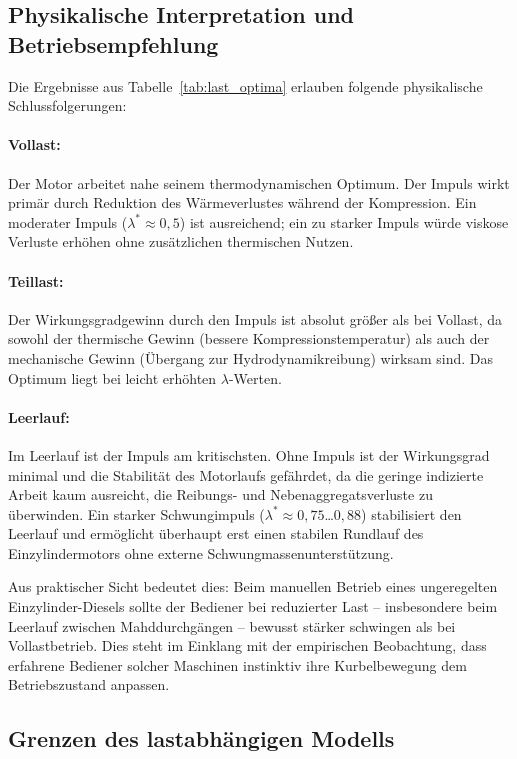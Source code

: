 ﻿\documentclass[a4paper,12pt]{article}
\begin{document}
\subsection{Physikalische Interpretation und Betriebsempfehlung}

Die Ergebnisse aus Tabelle~\ref{tab:last_optima} erlauben folgende physikalische
Schlussfolgerungen:

\paragraph{Vollast:} Der Motor arbeitet nahe seinem thermodynamischen Optimum.
Der Impuls wirkt primär durch Reduktion des Wärmeverlustes während der
Kompression. Ein moderater Impuls ($\lambda^* \approx 0{,}5$) ist ausreichend;
ein zu starker Impuls würde viskose Verluste erhöhen ohne zusätzlichen
thermischen Nutzen.

\paragraph{Teillast:} Der Wirkungsgradgewinn durch den Impuls ist absolut größer
als bei Vollast, da sowohl der thermische Gewinn (bessere Kompressionstemperatur)
als auch der mechanische Gewinn (Übergang zur Hydrodynamikreibung) wirksam sind.
Das Optimum liegt bei leicht erhöhten $\lambda$-Werten.

\paragraph{Leerlauf:} Im Leerlauf ist der Impuls am kritischsten. Ohne Impuls
ist der Wirkungsgrad minimal und die Stabilität des Motorlaufs gefährdet, da
die geringe indizierte Arbeit kaum ausreicht, die Reibungs- und Nebenaggregatsverluste
zu überwinden. Ein starker Schwungimpuls ($\lambda^* \approx 0{,}75$\ldots$0{,}88$)
stabilisiert den Leerlauf und ermöglicht überhaupt erst einen stabilen Rundlauf
des Einzylindermotors ohne externe Schwungmassenunterstützung.

Aus praktischer Sicht bedeutet dies: Beim manuellen Betrieb eines ungeregelten
Einzylinder-Diesels sollte der Bediener bei reduzierter Last -- insbesondere
beim Leerlauf zwischen Mahddurchgängen -- bewusst stärker schwingen als bei
Vollastbetrieb. Dies steht im Einklang mit der empirischen Beobachtung, dass
erfahrene Bediener solcher Maschinen instinktiv ihre Kurbelbewegung dem
Betriebszustand anpassen.

\subsection{Grenzen des lastabhängigen Modells}
\end{document}
